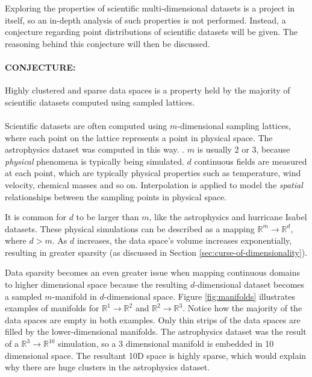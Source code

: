 Exploring the properties of scientific multi-dimensional datasets is a project in itself, so an in-depth analysis of such properties is not performed. Instead, a conjecture regarding point distributions of scientific datasets will be given. The reasoning behind this conjecture will then be discussed.

\paragraph{\textbf{CONJECTURE:}} Highly clustered and sparse data spaces is a property held by the majority of scientific datasets computed using sampled lattices.
\paragraph{}

Scientific datasets are often computed using $m$-dimensional sampling lattices, where each point on the lattice represents a point in physical space. The astrophysics dataset was computed in this way. \cite{astrophysics-dataset}. $m$ is usually 2 or 3, because \textit{physical} phenomena is typically being simulated. $d$ continuous fields are measured at each point, which are typically physical properties such as temperature, wind velocity, chemical masses and so on. Interpolation is applied to model the \textit{spatial} relationships between the sampling points in physical space.

It is common for $d$ to be larger than $m$, like the astrophysics and hurricane Isabel datasets. These physical simulations can be described as a mapping $\mathbb{R}^m \rightarrow \mathbb{R}^d$, where $d > m$. As $d$ increases, the data space's volume increases exponentially, resulting in greater sparsity (as discussed in Section \ref{sec:curse-of-dimensionality}).

Data sparsity becomes an even greater issue when mapping continuous domains to higher dimensional space because the resulting $d$-dimensional dataset becomes a sampled $m$-manifold in $d$-dimensional space. Figure \ref{fig:manifolds} illustrates examples of manifolds for $\mathbb{R}^1 \rightarrow \mathbb{R}^2$ and $\mathbb{R}^2 \rightarrow \mathbb{R}^3$. Notice how the majority of the data spaces are empty in both examples. Only thin strips of the data spaces are filled by the lower-dimensional manifolds. The astrophysics dataset was the result of a $\mathbb{R}^3 \rightarrow \mathbb{R}^{10}$ simulation, so a 3 dimensional manifold is embedded in 10 dimensional space. The resultant 10D space is highly sparse, which would explain why there are huge clusters in the astrophysics dataset.

